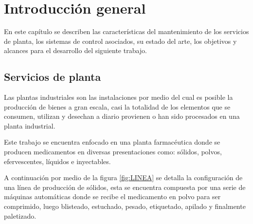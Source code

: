 
\chapter{Introducción general} %

\label{Chapter1} %
\label{IntroGeneral}


\newcommand{\keyword}[1]{\textbf{#1}}
\newcommand{\tabhead}[1]{\textbf{#1}}
\newcommand{\code}[1]{\texttt{#1}}
\newcommand{\file}[1]{\texttt{\bfseries#1}}
\newcommand{\option}[1]{\texttt{\itshape#1}}
\newcommand{\grados}{$^{\circ}$}



En este capítulo se describen las características del mantenimiento de los servicios de planta, los sistemas de control asociados, su estado del arte, los objetivos y alcances para el desarrollo del siguiente trabajo.

\section{Servicios de planta}

Las plantas industriales son las instalaciones por medio del cual es posible la producción de bienes a gran escala, casi la totalidad de los elementos que se consumen, utilizan y desechan a diario provienen o han sido procesados en una planta industrial. 

Este trabajo se encuentra enfocado en una planta farmacéutica donde se producen medicamentos en diversas presentaciones como: sólidos, polvos, efervescentes, líquidos e inyectables.

A continuación por medio de la figura \ref{fig:LINEA} se detalla la configuración de una línea de producción de sólidos, esta se encuentra compuesta por una serie de máquinas automáticas donde se recibe el medicamento en polvo para ser comprimido, luego blisteado, estuchado, pesado, etiquetado, apilado y finalmente paletizado.

